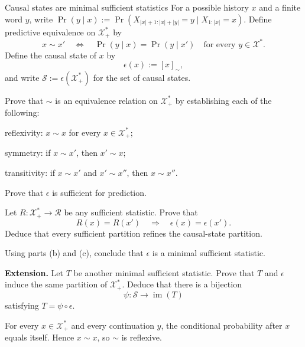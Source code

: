 \begin{exercise}[Core]{Causal states are minimal sufficient statistics}
  For a possible history $x$ and a finite word $y$, write
  $\Pr(y\mid x):=\Pr(X_{|x|+1:|x|+|y|}=y\mid X_{1:|x|}=x)$.
  Define predictive equivalence on $\mathcal X_+^*$ by
  \[
    x\sim x'
    \quad\Longleftrightarrow\quad
    \Pr(y\mid x)=\Pr(y\mid x')
    \quad\text{for every }y\in\mathcal X^*.
  \]
  Define the causal state of $x$ by
  \[
    \epsilon(x):=[x]_{\sim},
  \]
  and write $\mathcal S:=\epsilon(\mathcal X_+^*)$ for the set of
  causal states.

  \begin{parts}
    \item Prove that $\sim$ is an equivalence relation on
      $\mathcal X_+^*$ by establishing each of the following:
      \begin{subparts}
        \item reflexivity: $x\sim x$ for every $x\in\mathcal X_+^*$;
        \item symmetry: if $x\sim x'$, then $x'\sim x$;
        \item transitivity: if $x\sim x'$ and $x'\sim x''$, then
          $x\sim x''$.
      \end{subparts}

    \item Prove that $\epsilon$ is sufficient for prediction.

    \item Let $R:\mathcal X_+^*\to\mathcal R$ be any sufficient statistic.
      Prove that
      \[
        R(x)=R(x')\quad\Longrightarrow\quad
        \epsilon(x)=\epsilon(x').
      \]
      Deduce that every sufficient partition refines the causal-state
      partition.

    \item Using parts (b) and (c), conclude that $\epsilon$ is a minimal
      sufficient statistic.

    \item \textbf{Extension.} Let $T$ be another minimal sufficient
      statistic. Prove that $T$ and $\epsilon$ induce the same partition of
      $\mathcal X_+^*$. Deduce that there is a bijection
      \[
        \psi:\mathcal S\to\operatorname{im}(T)
      \]
      satisfying $T=\psi\circ\epsilon$.
  \end{parts}

  \begin{solution}
    \begin{parts}
      \item
        \begin{subparts}
          \item For every $x\in\mathcal X_+^*$ and every continuation $y$,
            the conditional probability after $x$ equals itself. Hence
            $x\sim x$, so $\sim$ is reflexive.


\end{subparts}
\end{parts}
\end{solution}
\end{exercise}
